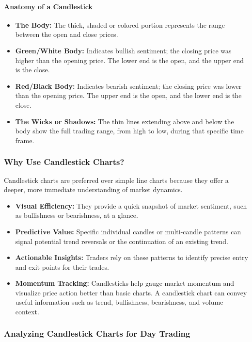 \documentclass[12pt,openany]{book}
\begin{document}
\paragraph{Anatomy of a Candlestick}
\begin{itemize}[leftmargin=*]
    \item \textbf{The Body:} The thick, shaded or colored portion represents the range between the open and close prices.
    \item \textbf{Green/White Body:} Indicates bullish sentiment; the closing price was higher than the opening price. The lower end is the open, and the upper end is the close.
    \item \textbf{Red/Black Body:} Indicates bearish sentiment; the closing price was lower than the opening price. The upper end is the open, and the lower end is the close.
    \item \textbf{The Wicks or Shadows:} The thin lines extending above and below the body show the full trading range, from high to low, during that specific time frame.
\end{itemize}

\subsubsection{Why Use Candlestick Charts?}
Candlestick charts are preferred over simple line charts because they offer a deeper, more immediate understanding of market dynamics.

\begin{itemize}[leftmargin=*]
    \item \textbf{Visual Efficiency:} They provide a quick snapshot of market sentiment, such as bullishness or bearishness, at a glance.
    \item \textbf{Predictive Value:} Specific individual candles or multi-candle patterns can signal potential trend reversals or the continuation of an existing trend.
    \item \textbf{Actionable Insights:} Traders rely on these patterns to identify precise entry and exit points for their trades.
    \item \textbf{Momentum Tracking:} Candlesticks help gauge market momentum and visualize price action better than basic charts. A candlestick chart can convey useful information such as trend, bullishness, bearishness, and volume context.
\end{itemize}

\subsubsection{Analyzing Candlestick Charts for Day Trading}
\end{document}
